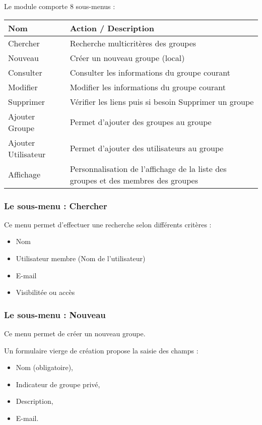 Le module \group comporte 8 sous-menus :

\begin{tabular}{|p{3.5cm}|p{9.5cm}|}
\hline
\textbf{Nom} & \textbf{Action / Description} \\
\hline
Chercher & Recherche multicritères des groupes \\
\hline
Nouveau & Créer un nouveau groupe (local) \\
\hline
Consulter & Consulter les informations du groupe courant \\
\hline
Modifier & Modifier les informations du groupe courant\\
\hline
Supprimer & Vérifier les liens puis si besoin Supprimer un groupe\\
\hline
Ajouter Groupe & Permet d'ajouter des groupes au groupe\\
\hline
Ajouter Utilisateur & Permet d'ajouter des utilisateurs au groupe\\
\hline
Affichage & Personnalisation de l'affichage de la liste des groupes et des membres des groupes\\
\hline
\end{tabular}


\subsubsection{Le sous-menu : Chercher}

Ce menu permet d'effectuer une recherche selon différents critères :

\begin{itemize}
\item Nom
\item Utilisateur membre (Nom de l'utilisateur)
\item E-mail
\item Visibilitée ou accès
\end{itemize}


\subsubsection{Le sous-menu : Nouveau}

Ce menu permet de créer un nouveau groupe.

Un formulaire vierge de création propose la saisie des champs :

\begin{itemize}
\item Nom (obligatoire),
\item Indicateur de groupe privé,
\item Description,
\item E-mail.
\end{itemize}


